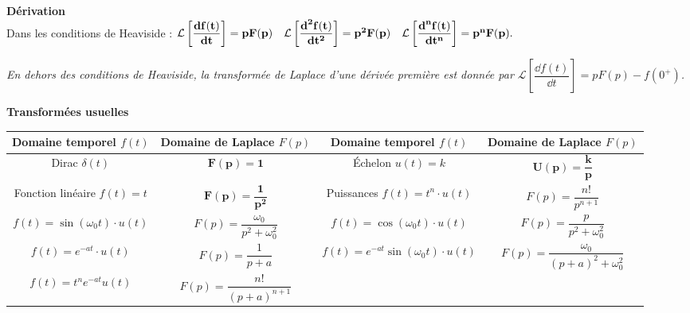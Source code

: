 \begin{resultat} \textbf{\textsf{Dérivation}}~\\


\noindent Dans les conditions de Heaviside :
$\mathbf{\mathcal{L}\left[ \dfrac{\text{\textbf{d}} f(t)}{\text{\textbf{d}} t}\right] =pF(p) 
 \quad
\mathcal{L}\left[ \dfrac{\text{\textbf{d}}^2f(t)}{\text{\textbf{d}} t^2}\right] =p^2F(p) 
 \quad
\mathcal{L}\left[ \dfrac{\text{\textbf{d}}^nf(t)}{\text{\textbf{d}} t^n}\right] =p^nF(p) }.$

\noindent\textit{\footnotesize{En dehors des conditions de Heaviside, la transformée de Laplace d'une dérivée première est donnée par $\mathcal{L}\left[ \dfrac{\dd f(t)}{\dd t}\right] =pF(p)-f(0^+)$.}}


\end{resultat}


\begin{defi} \textbf{\textsf{Transformées usuelles}} ~\\
\footnotesize{

\begin{center}
\begin{tabular}{|c|c||c|c|}
\hline
Domaine temporel $f(t)$ & Domaine de Laplace $F(p)$ & 
Domaine temporel $f(t)$ & Domaine de Laplace $F(p)$ \\
\hline
\hline
Dirac $\delta(t)$ &
$\mathbf{F(p)=1}$ &
Échelon $ u(t)=k $&
$ \mathbf{U(p) = \dfrac{k}{p}}$
\\
\hline
Fonction linéaire $f(t)=t$& 
$\mathbf{F(p) =\dfrac{1}{p^2} }$ &
Puissances
$f(t) = t^n\cdot u(t)$ &
$F(p)=\dfrac{n!}{p^{n+1}} $
\\
\hline
$f(t) = \sin \left( \omega_0 t\right) \cdot u(t)$ &
$F(p) = \dfrac{\omega_0}{p^2+\omega_0^2} $ &
$f(t) = \cos \left( \omega_0 t\right) \cdot u(t)$ & 
$F(p) = \dfrac{p}{p^2+\omega_0^2} $ \\
\hline
$f(t)= e^{-at}\cdot u(t)$ & 
$F(p)= \dfrac{1}{p+a}$ &
$f(t) = e^{-at}\sin\left( \omega_0 t\right) \cdot u(t)$ &
$F(p)=\dfrac{\omega_0}{\left( p+a\right)^2 + \omega_0^2}$  \\
\hline
$f(t)=t^ne^{-at}u(t)$ & $F(p)=\dfrac{n!}{\left( p+a\right)^{n+1}}$
& &
\\
\hline
\end{tabular}
\end{center}}
\end{defi}


